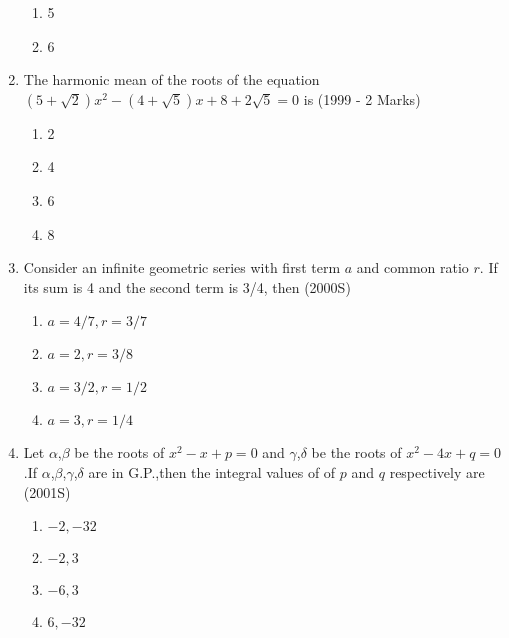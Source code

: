 \documentclass[journal,12pt,twocolumn]{IEEEtran}
\theoremstyle{remark}
\begin{document}
\begin{enumerate}
\begin{enumerate}
        \item 5
        \item 6
        \end{enumerate}
\item The harmonic mean of the roots of the equation
        $(5+\sqrt{2})x^2-(4+\sqrt{5})x+8+2\sqrt{5}=0$ is 
        \hfill(1999 - 2 Marks)
        \begin{enumerate}
            \item 2
            \item 4
            \item 6
            \item 8
        \end{enumerate}
\item Consider an infinite geometric series with first term $a$ and common ratio $r$. If its sum is 4 and the second term is 3/4, then \hfill (2000S)
        \begin{enumerate}
            \item $a=4/7,r=3/7$
            \item $a=2,r=3/8$
            \item $a=3/2,r=1/2$
            \item $a=3,r=1/4$
            \end{enumerate}
\item Let $\alpha$,$\beta$ be the roots of $x^2-x+p=0$ and $\gamma$,$\delta$ be the roots of $x^2-4x+q=0$.If $\alpha$,$\beta$,$\gamma$,$\delta$ are in G.P.,then the integral values of of $p$ and $q$ respectively are \hfill(2001S)
            \begin{enumerate}
                \item $-2,-32$
                \item $-2,3$
                \item $-6,3$
                \item $6,-32$
        

\end{enumerate}
\end{enumerate}
\end{document}
